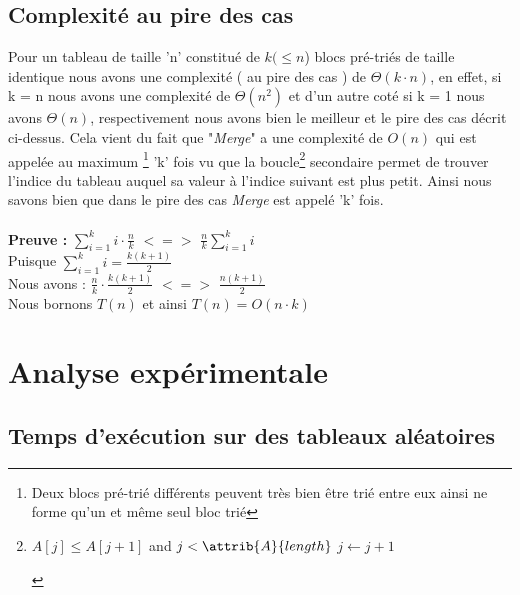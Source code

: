 \documentclass[a4paper, 11pt, oneside]{article}
\begin{document}
\subsection{Complexité au pire des cas}
Pour un tableau de taille 'n' constitué de $k(\leq n$) blocs pré-triés de taille identique nous avons une complexité ( au pire des cas ) de $\Theta(k \cdot n)$, en effet, si k = n nous avons une complexité de $\Theta(n^{2})$ et d'un autre coté si k = 1 nous avons $\Theta(n)$, respectivement nous avons bien le meilleur et le pire des cas décrit ci-dessus. Cela vient du fait que "\textit{Merge}" a une complexité de $O(n)$ qui est appelée au maximum \footnote{Deux blocs pré-trié différents peuvent très bien être trié entre eux ainsi ne forme qu'un et même seul bloc trié} 'k' fois vu que la boucle\footnote{\begin{codebox}
\li \While $A[j] \leq A[j+1]$ and $j < \attrib{A}{length}$
\li \Do
$j \gets j + 1$

\End
\end{codebox} }
secondaire permet de trouver l'indice du tableau auquel sa valeur à l'indice suivant est plus petit. Ainsi nous savons bien que dans le pire des cas \textit{Merge} est appelé 'k' fois. \\ \\
\textbf{Preuve :}
$\sum_{i = 1}^{k} i \cdot \frac{n}{k}$ $<=>$ $\frac{n}{k}\sum_{i = 1}^{k} i$ \\ 
\indent Puisque \indent$\sum_{i = 1}^{k} i = \frac{k(k+1)}{2}$ \\
\indent Nous avons : \indent $\frac{n}{k} \cdot \frac{k(k+1)}{2}$ $<=>$ $ \frac{n(k+1)}{2}$ \\ Nous bornons $T(n)$ et ainsi $T(n) = O(n \cdot k)$

\newpage

\section{Analyse expérimentale}
\subsection{Temps d'exécution sur des tableaux aléatoires}
\end{document}

